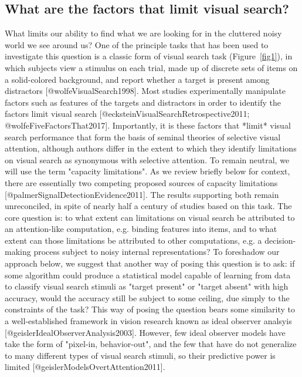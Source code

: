 \documentclass[10pt,letterpaper]{article}
\begin{document}
\subsection{What are the factors that limit visual search?}
What limits our ability to find what we are looking for in the cluttered noisy world we 
see around us? One of the principle tasks that has been used to investigate this question
is a classic form of visual search task (Figure~\ref{fig1}), in which subjects view a stimulus on each trial, 
made up of discrete sets of items on a solid-colored background, and report whether a 
target is present among distractors [@wolfeVisualSearch1998]. 
Most studies experimentally manipulate factors such as features of the targets and 
distractors in order to identify the factors limit visual search 
[@ecksteinVisualSearchRetrospective2011; @wolfeFiveFactorsThat2017].
Importantly, it is these factors that *limit* visual search performance that form the 
basis of seminal theories of selective visual attention, although authors differ in the 
extent to which they identify limitations on visual search as synonymous with selective 
attention. To remain neutral, we will use the term "capacity limitations". 
As we review briefly below for context, there are essentially two competing proposed 
sources of capacity limitations [@palmerSignalDetectionEvidence2011]. 
The results supporting both remain unreconciled, in spite of nearly half a century of 
studies based on this task. The core question is: to 
what extent can limitations on visual search be attributed to an attention-like 
computation, e.g. binding features into items, and to what extent can those limitations be 
attributed to other computations, e.g. a decision-making process subject to  
noisy internal representations?
To foreshadow our approach below, we suggest that another way of posing this question is 
to ask: if some algorithm could produce a statistical model capable of learning from data 
to classify visual search stimuli as "target present" or "target absent" with high 
accuracy, would the accuracy still be subject to some ceiling, due simply to the 
constraints of the task? This way of posing the question bears some similarity to a 
well-established framework in vision research known as ideal observer analsyis 
[@geislerIdealObserverAnalysis2003]. However, few ideal observer models have take the 
form of "pixel-in, behavior-out", and the few that have do not generalize to many 
different types of visual search stimuli, so their predictive power is limited 
[@geislerModelsOvertAttention2011].
\end{document}
